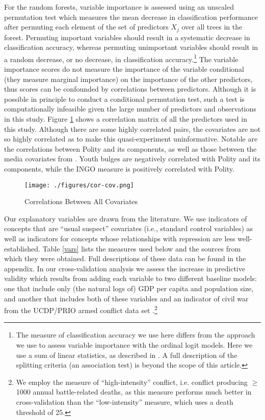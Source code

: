\documentclass[12pt]{article}
\begin{document}
For the random forests, variable importance is assessed using an unscaled permutation test which measures the mean decrease in classification performance after permuting each element of the set of predictors $X_j$ over all trees in the forest. Permuting important variables should result in a systematic decrease in classification accuracy, whereas permuting unimportant variables should result in a random decrease, or no decrease, in classification accuracy.\footnote{The measure of classification accuracy we use here differs from the approach we use to assess variable importance with the ordinal logit models. Here we use a sum of linear statistics, as described in \citet{hothorn2006unbiased}. A full description of the splitting criteria (an association test) is beyond the scope of this article.} The variable importance scores do not measure the importance of the variable conditional (they measure marginal importance) on the importance of the other predictors, thus scores can be confounded by correlations between predictors. Although it is possible in principle to conduct a conditional permutation test, such a test is computationally infeasible given the large number of predictors and observations in this study. Figure \ref{fig:cor-cov} shows a correlation matrix of all the predictors used in this study. Although there are some highly correlated pairs, the covariates are not so highly correlated as to make this quasi-experiment uninformative. Notable are the correlations between Polity and its components, as well as those between the media covariates from \citet{RonRamosRodgers2005}. Youth bulges are negatively correlated with Polity and its components, while the INGO measure is positively correlated with Polity. 

\begin{figure}[!htpb]
\texttt{[image: ./figures/cor-cov.png]}
\caption{Correlations Between All Covariates} 
\label{fig:cor-cov}
\end{figure}

Our explanatory variables are drawn from the literature. We use indicators of concepts that are ``usual suspect'' covariates (i.e., standard control variables) as well as indicators for concepts whose relationships with repression are less well-established. Table \ref{vars} lists the measures used below and the sources from which they were obtained. Full descriptions of these data can be found in the appendix. In our cross-validation analysis we assess the increase in predictive validity which results from adding each variable to two different baseline models: one that include only (the natural logs of) GDP per capita and population size, and another that includes both of these variables and an indicator of civil war from the UCDP/PRIO armed conflict data set \citep{ThemnerWallensteen2012}.\footnote{We employ the measure of ``high-intensity'' conflict, i.e. conflict producing $\geq$ 1000 annual battle-related deaths, as this measure performs much better in cross-validation than the ``low-intensity'' measure, which uses a death threshold of 25.}
\end{document}
